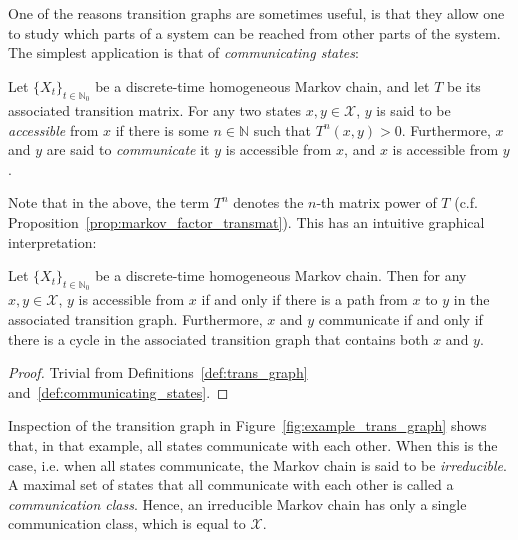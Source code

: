 \documentclass[graybox]{svmult}
\newcommand{\nats}{\mathbb{N}}
\newcommand{\natswith}{\nats_{0}}
\newcommand{\states}{\mathcal{X}}
\begin{document}
One of the reasons transition graphs are sometimes useful, is that they allow one to study which parts of a system can be reached from other parts of the system. The simplest application is that of \emph{communicating states}:
\begin{definition}\label{def:communicating_states}
Let $\{X_t\}_{t\in\natswith}$ be a discrete-time homogeneous Markov chain, and let $T$ be its associated transition matrix. For any two states $x,y\in\states$, $y$ is said to be \emph{accessible} from $x$ if there is some $n\in\nats$ such that $T^n(x,y)>0$. Furthermore, $x$ and $y$ are said to \emph{communicate} it $y$ is accessible from $x$, and $x$ is accessible from $y$. 
\end{definition}
Note that in the above, the term $T^n$ denotes the $n$-th matrix power of $T$ (c.f. Proposition~\ref{prop:markov_factor_transmat}). This has an intuitive graphical interpretation:
\begin{corollary}
Let $\{X_t\}_{t\in\natswith}$ be a discrete-time homogeneous Markov chain. Then for any $x,y\in\states$, $y$ is accessible from $x$ if and only if there is a path from $x$ to $y$ in the associated transition graph. Furthermore, $x$ and $y$ communicate if and only if there is a cycle in the associated transition graph that contains both $x$ and $y$.
\end{corollary}
\begin{proof}
Trivial from Definitions~\ref{def:trans_graph} and~\ref{def:communicating_states}.
\end{proof}
Inspection of the transition graph in Figure~\ref{fig:example_trans_graph} shows that, in that example, all states communicate with each other. When this is the case, i.e. when all states communicate, the Markov chain is said to be \emph{irreducible}. A maximal set of states that all communicate with each other is called a \emph{communication class}. Hence, an irreducible Markov chain has only a single communication class, which is equal to $\states$.
\end{document}
